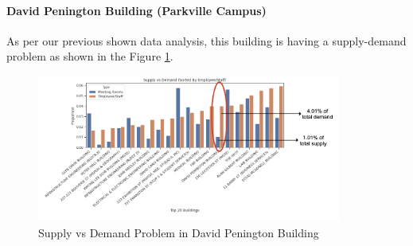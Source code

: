\paragraph{David Penington Building (Parkville Campus)}

As per our previous shown data analysis, this building is having a supply-demand problem as shown in the Figure \ref{fig:david_mr_s_vs_d}. 

\begin{figure}[H]
\centering
\includegraphics[width=10cm,keepaspectratio=true]{resources/images/spatial-mr/david-mr/david_penington_01.png}
\caption{Supply vs Demand Problem in David Penington Building}
\label{fig:david_mr_s_vs_d}
\end{figure}


